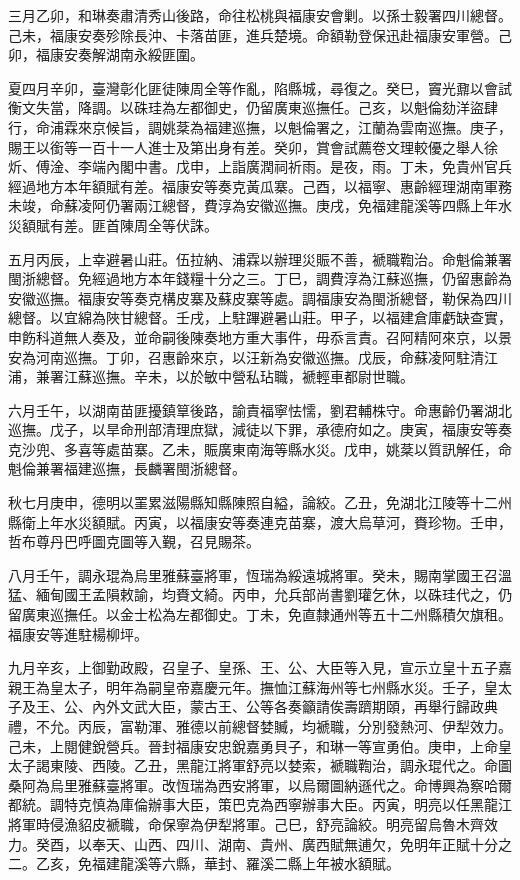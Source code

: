 \begin{pinyinscope}
三月乙卯，和琳奏肅清秀山後路，命往松桃與福康安會剿。以孫士毅署四川總督。己未，福康安奏殄除長沖、卡落苗匪，進兵楚境。命額勒登保迅赴福康安軍營。己卯，福康安奏解湖南永綏匪圍。

夏四月辛卯，臺灣彰化匪徒陳周全等作亂，陷縣城，尋復之。癸巳，竇光鼐以會試衡文失當，降調。以硃珪為左都御史，仍留廣東巡撫任。己亥，以魁倫劾洋盜肆行，命浦霖來京候旨，調姚棻為福建巡撫，以魁倫署之，江蘭為雲南巡撫。庚子，賜王以銜等一百十一人進士及第出身有差。癸卯，賞會試薦卷文理較優之舉人徐炘、傅淦、李端內閣中書。戊申，上詣廣潤祠祈雨。是夜，雨。丁未，免貴州官兵經過地方本年額賦有差。福康安等奏克黃瓜寨。己酉，以福寧、惠齡經理湖南軍務未竣，命蘇凌阿仍署兩江總督，費淳為安徽巡撫。庚戌，免福建龍溪等四縣上年水災額賦有差。匪首陳周全等伏誅。

五月丙辰，上幸避暑山莊。伍拉納、浦霖以辦理災賑不善，褫職鞫治。命魁倫兼署閩浙總督。免經過地方本年錢糧十分之三。丁巳，調費淳為江蘇巡撫，仍留惠齡為安徽巡撫。福康安等奏克構皮寨及蘇皮寨等處。調福康安為閩浙總督，勒保為四川總督。以宜綿為陜甘總督。壬戌，上駐蹕避暑山莊。甲子，以福建倉庫虧缺查實，申飭科道無人奏及，並命嗣後陳奏地方重大事件，毋忝言責。召阿精阿來京，以景安為河南巡撫。丁卯，召惠齡來京，以汪新為安徽巡撫。戊辰，命蘇凌阿駐清江浦，兼署江蘇巡撫。辛未，以於敏中營私玷職，褫輕車都尉世職。

六月壬午，以湖南苗匪擾鎮筸後路，諭責福寧怯懦，劉君輔株守。命惠齡仍署湖北巡撫。戊子，以旱命刑部清理庶獄，減徒以下罪，承德府如之。庚寅，福康安等奏克沙兜、多喜等處苗寨。乙未，賑廣東南海等縣水災。戊申，姚棻以質訊解任，命魁倫兼署福建巡撫，長麟署閩浙總督。

秋七月庚申，德明以罣累滋陽縣知縣陳照自縊，論絞。乙丑，免湖北江陵等十二州縣衛上年水災額賦。丙寅，以福康安等奏連克苗寨，渡大烏草河，賚珍物。壬申，哲布尊丹巴呼圖克圖等入覲，召見賜茶。

八月壬午，調永琨為烏里雅蘇臺將軍，恆瑞為綏遠城將軍。癸未，賜南掌國王召溫猛、緬甸國王孟隕敕諭，均賚文綺。丙申，允兵部尚書劉瓘乞休，以硃珪代之，仍留廣東巡撫任。以金士松為左都御史。丁未，免直隸通州等五十二州縣積欠旗租。福康安等進駐楊柳坪。

九月辛亥，上御勤政殿，召皇子、皇孫、王、公、大臣等入見，宣示立皇十五子嘉親王為皇太子，明年為嗣皇帝嘉慶元年。撫恤江蘇海州等七州縣水災。壬子，皇太子及王、公、內外文武大臣，蒙古王、公等各奏籲請俟壽躋期頤，再舉行歸政典禮，不允。丙辰，富勒渾、雅德以前總督婪贓，均褫職，分別發熱河、伊犁效力。己未，上閱健銳營兵。晉封福康安忠銳嘉勇貝子，和琳一等宣勇伯。庚申，上命皇太子謁東陵、西陵。乙丑，黑龍江將軍舒亮以婪索，褫職鞫治，調永琨代之。命圖桑阿為烏里雅蘇臺將軍。改恆瑞為西安將軍，以烏爾圖納遜代之。命博興為察哈爾都統。調特克慎為庫倫辦事大臣，策巴克為西寧辦事大臣。丙寅，明亮以任黑龍江將軍時侵漁貂皮褫職，命保寧為伊犁將軍。己巳，舒亮論絞。明亮留烏魯木齊效力。癸酉，以奉天、山西、四川、湖南、貴州、廣西賦無逋欠，免明年正賦十分之二。乙亥，免福建龍溪等六縣，華封、羅溪二縣上年被水額賦。


\end{pinyinscope}
